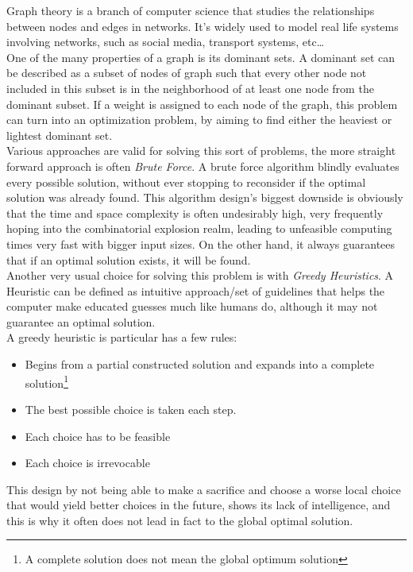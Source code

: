 \documentclass[mirror,times]{revdetua}
\begin{document}
Graph theory is a branch of computer science that studies the relationships between
nodes and edges in networks. It's widely used to model real life systems
involving networks, such as social media, transport systems, etc…\\
One of the many properties of a graph is its dominant sets. A dominant set can
be described as a subset of nodes of graph such that every other node not
included in this subset is in the neighborhood of at least one node from the
dominant subset. If a weight is assigned to each node of the graph, this problem
can turn into an optimization problem, by aiming to find either the heaviest or
lightest dominant set.\\
Various approaches are valid for solving this sort of problems, the more straight forward
approach is often \textit{Brute Force}. A brute force algorithm blindly
evaluates every possible solution, without ever stopping to reconsider if the
optimal solution was already found. This algorithm design's biggest downside is
obviously that the time and space complexity is often undesirably high, very
frequently hoping into the combinatorial explosion realm, leading to unfeasible
computing times very fast with bigger input sizes. On the other hand, it always guarantees that if an
optimal solution exists, it will be found.\\
Another very usual choice for solving this problem is with \textit{Greedy
Heuristics}. A Heuristic can be defined as intuitive approach/set of guidelines that helps
the computer make educated guesses much like humans do, although it may not
guarantee an optimal solution.\\
A greedy heuristic is particular has a few rules:\begin{itemize}
  \item Begins from a partial constructed solution and expands into a complete
  solution\footnote{A complete solution does not mean the global optimum
  solution}
  \item The best possible choice is taken each step.
  \item Each choice has to be feasible
  \item Each choice is irrevocable
\end{itemize}

This design by not being able to make a sacrifice and choose a worse local
choice that would yield better choices in the future, shows its lack of
intelligence, and this is why it often does not lead in fact to the global
optimal solution.
 
\end{document}
